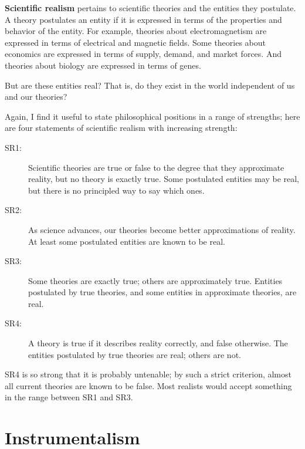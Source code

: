 \documentclass[12pt]{book}
\theoremstyle{exercise}
\begin{document}
{\bf Scientific realism} pertains to scientific theories and the
entities they postulate.
A theory postulates an entity if it is
expressed in terms of the properties and behavior of the entity.
For example, theories about electromagnetism are expressed in
terms of electrical and magnetic fields.  Some theories about economics
are expressed in terms of supply, demand, and market forces.
And theories about biology are expressed in terms of genes.

But are these entities real?  That is, do they exist in the world
independent of us and our theories?


Again, I find it useful to state philosophical positions in a range of
strengths; here are four statements of scientific realism with increasing
strength:

\begin{description}

\item[SR1:] Scientific theories are true or false to the degree that
  they approximate reality, but no theory is exactly true.  Some
  postulated entities may be real, but there is no principled way to
  say which ones.

\item[SR2:] As science advances, our theories become better
  approximations of reality.  At least some postulated entities are
  known to be real.

\item[SR3:] Some theories are exactly true; others are approximately
  true.  Entities postulated by true theories, and some entities
  in approximate theories, are real.

\item[SR4:] A theory is true if it describes reality correctly, and
  false otherwise.  The entities postulated by true theories are real;
  others are not.

\end{description}

SR4 is so strong that it is probably untenable; by such a strict
criterion, almost all current theories are known to be false.
Most realists would accept something in the range
between SR1 and SR3.


\section{Instrumentalism}
\end{document}
